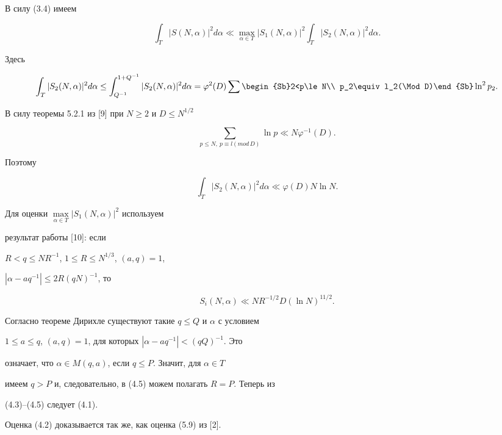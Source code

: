 \begin{pf}


В силу (3.4) имеем


\begin{equation}


\int_T|S(N,\alpha)|^2 d\alpha\ll\max\limits_{\alpha\in T}|S_1(N,\alpha)|^2


\int_T|S_2(N,\alpha)|^2 d\alpha.


\end{equation}


Здесь


$$


\int_T|S_2(N,\alpha)|^2 d\alpha\le\int_{Q^{-1}}^{1+Q^{-1}}


|S_2(N,\alpha)|^2 d\alpha=\varphi^2(D)


\sum\begin{Sb}2<p\le N\\ p_2\equiv l_2(\Mod D)\end{Sb}


\ln^2p_2.


$$


В силу теоремы 5.2.1 из [9] при $N\ge 2$ и $D\le N^{1/2}$


$$


\sum_{p\le N,\ p\equiv l(mod\,D)}\ln p\ll N\varphi^{-1}(D).


$$


Поэтому 


\begin{equation}


\int_T|S_2(N,\alpha)|^2 d\alpha\ll \varphi(D)N\ln N.


\end{equation}


Для оценки $\max\limits_{\alpha\in T}|S_1(N,\alpha)|^2$ используем


результат работы [10]: если


$R<q\le NR^{-1}$, $1\le R\le N^{1/3}$, $(a,q)=1$,


$|\alpha -aq^{-1}|\le 2R(qN)^{-1}$, то 


\begin{equation}


S_i (N,\alpha)\ll NR^{-1/2}D(\ln N)^{11/2}.


\end{equation}


Согласно теореме Дирихле существуют такие $q\le Q$ и $\alpha$ с условием


$1\le a\le q$, $(a, q)=1$, для которых $|\alpha -aq^{-1}|<(qQ)^{-1}$. Это


означает, что $\alpha\in M(q,a)$, если $q\le P$. Значит, для $\alpha\in T$


имеем $q>P$ и, следовательно, в (4.5) можем полагать $R=P$. Теперь из


(4.3)--(4.5) следует (4.1).





Оценка (4.2) доказывается так же, как оценка (5.9) из [2].


\end{pf}





